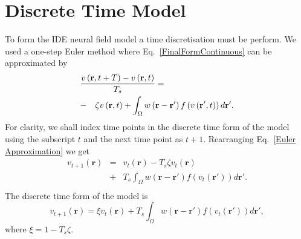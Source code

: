 \documentclass[twocolumn,11pt,a4paper]{article}		%
\begin{document}
\section{Discrete Time Model}\label{Time Discretization} To form the IDE neural field model a time discretisation must be perform. We used a one-step Euler method where Eq.~\ref{FinalFormContinuous} can be approximated by 
\begin{eqnarray}
	\label{Euler Approximation} \lefteqn{\frac{v\left( \mathbf{r},t+T \right) - v\left( \mathbf{r},t\right)}{T_s} =}\nonumber\\
& -&\zeta v\left( \mathbf{r},t \right) + \int_\Omega {w\left( \mathbf{r}-\mathbf{r}' \right)f\left( {v\left( \mathbf{r}',t \right)} \right)d\mathbf{r}'}.\nonumber \\ 
\end{eqnarray}
For clarity, we shall index time points in the discrete time form of the model using the subscript $t$ and the next time point as $t+1$. Rearranging Eq.~\ref{Euler Approximation} we get 
\begin{eqnarray}
	\label{Euler Approximation2} v_{t+1}\left( \mathbf{r}\right) &=& v_t\left( \mathbf{r}\right) -T_s \zeta v_t\left( \mathbf{r}\right)\nonumber \\
&+& T_s \int_\Omega {w\left( \mathbf{r}-\mathbf{r}' \right)f\left( {v_t\left( \mathbf{r}'\right)} \right)d\mathbf{r}'}.\nonumber \\ 
\end{eqnarray}
The discrete time form of the model is 
\begin{equation}
	\label{Discrete Time Model1} v_{t+1}\left(\mathbf{r}\right) = \xi v_t\left(\mathbf{r}\right) + T_s \int_\Omega { w\left(\mathbf{r}-\mathbf{r}'\right) f\left(v_t\left(\mathbf{r}'\right)\right) d\mathbf{r}'}, 
\end{equation}
where $\xi = 1 - T_s \zeta$. 
\end{document}
